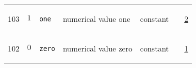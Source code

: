 \begin{longtable}{|p{1cm}|p{2.5cm}|p{4.5cm}|p{8cm}|p{3.0cm}|p{3cm}|p{1cm}|}
            103
             & \hypertarget{"v:103"}{ $ {1}{_{}} $}
             & \verb|one|
             & numerical value one
             & \begin{lay}constant \end{lay}
             & $  $
             &                 \hyperlink{"e:2"}{ 2 }
                 \\
            102
             & \hypertarget{"v:102"}{ $ {0}{_{}} $}
             & \verb|zero|
             & numerical value zero
             & \begin{lay}constant \end{lay}
             & $  $
             &                 \hyperlink{"e:1"}{ 1 }
                 \\
    \end{longtable}